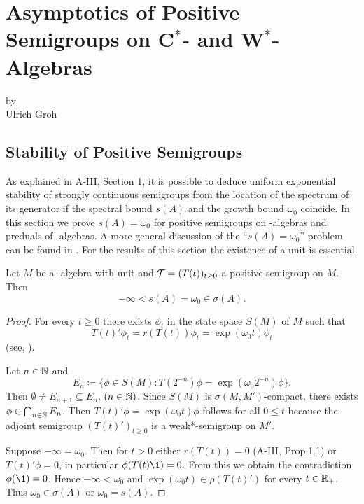 \chapter{Asymptotics of Positive Semigroups on \texorpdfstring{C$^{*}$}{C*}- and \texorpdfstring{W$^{*}$}{W*}-Algebras}\label{chap:d4}
{\Large
\vspace*{-.75cm}
by \\[.25em]
Ulrich Groh
\vspace{.75cm}
\\
}
\section{Stability of Positive Semigroups}\label{sec:d4-1}
As explained in A-III, Section 1, it is possible to deduce uniform exponential stability of strongly continuous semigroups from the location of the spectrum of its generator if the spectral bound $ s(A) $ and the growth bound $ \omega_{0} $ coincide.
In this section we prove $s(A) = \omega_{0}$ for positive semigroups on \CA-algebras and preduals of \WA-algebras.
A more general discussion of the \enquote{$s(A) = \omega_{0}$} problem can be found in \citet{greinervoigtwolff:1981}.
For the results of this section the existence of a unit is essential.
\begin{theorem}\label{thm:d4-1.1}
Let $M$ be a \CA-algebra with unit and $\mathcal{T} = (T(t))_{t \geq 0}$ a positive semigroup on $M$.
Then
\[
	-\infty < s(A) = \omega_{0} \in \sigma(A).
\]
\end{theorem}
\begin{proof}
For every  $t \geq 0 $ there exists $\phi_{t}$ in the state space $S(M)$ of $M$ such that
\[
	T(t)'\phi_{t} = r(T(t))\phi_{t} = \exp(\omega_{0} t)\phi_{t}
\]
(see, \eg \citet[2.1]{groh:1981}).

Let $n \in \mathbb{N}$ and
\[
	E_{n} \coloneqq \{\phi \in S(M) \colon T(2^{-n})\phi = \exp(\omega_{0} 2^{-n})\phi \}.
\]
Then $\emptyset \neq E_{n+1} \subseteq E_{n}$,  $(n \in \mathbb{N})$.
Since $S(M)$ is $\sigma(M,M')$-compact, there exists $\phi \in \bigcap_{n \in \mathbb{N}} E_{n}$.
Then $ T(t)'\phi = \exp(\omega_{0} t)\phi$ follows for all $ 0 \leq t $ because the adjoint semigroup $(T(t)')_{t \geq 0}$ is a weak*-semigroup on $M'$.

Suppose $-\infty = \omega_{0}$.
Then for $t > 0$ either $r(T(t)) = 0$ (A-III, Prop.1.1) or $T(t)'\phi = 0$, in particular $\phi(T(t)\1) = 0$.
From this we obtain the contradiction $\phi(\1) = 0$.
Hence $-\infty < \omega_{0}$ and $\exp(\omega_{0} t) \in \rho(T(t)')$ for every $t \in \mathbb{R}_{+}$.
Thus $\omega_{0} \in \sigma(A)$ or $\omega_{0} = s(A)$.
\end{proof}
